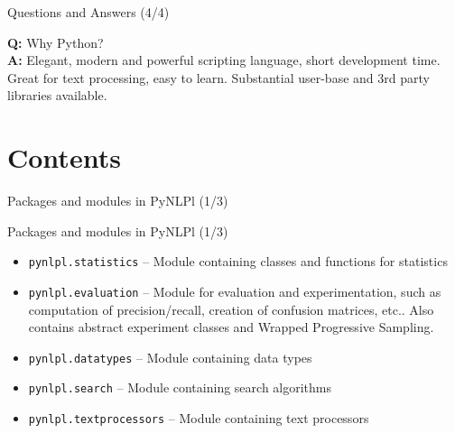 \documentclass[compress]{beamer}
\begin{document}
\begin{frame}{Questions and Answers (4/4)}

        \textbf{Q:} Why Python? \\
        \textbf{A:} Elegant, modern and powerful scripting language, short development time. Great for text processing, easy to learn. Substantial user-base and 3rd party libraries available.        
\end{frame}

\section{Contents}

\begin{frame}{Packages and modules in PyNLPl (1/3)}
    \begin{block}{Packages and modules in PyNLPl (1/3)}
        \begin{itemize}
            \item \texttt{pynlpl.statistics} -- Module containing classes and functions for statistics
            \item \texttt{pynlpl.evaluation} -- Module for evaluation and experimentation, such as computation of precision/recall, creation of confusion matrices, etc.. Also contains abstract experiment classes and Wrapped Progressive Sampling.
            \item \texttt{pynlpl.datatypes} -- Module containing data types
            \item \texttt{pynlpl.search} -- Module containing search algorithms
            \item \texttt{pynlpl.textprocessors} -- Module containing text processors
        \end{itemize}
    \end{block}

\end{frame}
\end{document}
